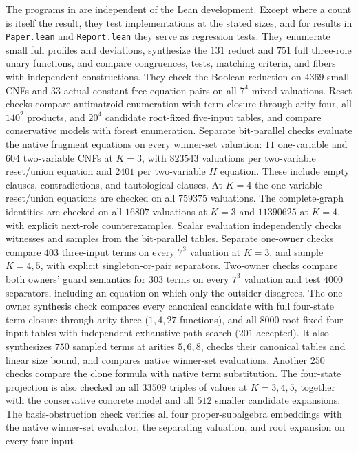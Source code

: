 The programs in  are independent of the Lean development. Except where a count is itself the result, they test implementations at the stated sizes, and for results in \texttt{Paper.lean} and \texttt{Report.lean} they serve as regression tests. They
enumerate small full profiles and deviations, synthesize the $131$
reduct and $751$ full three-role unary functions, and compare congruences,
tests, matching criteria, and fibers with independent constructions.
They check the Boolean reduction on $4369$ small CNFs and $33$ actual
constant-free equation pairs on all $7^4$ mixed valuations. Reset checks
compare antimatroid enumeration with term closure through arity four,
all $140^2$ products, and $20^4$ candidate root-fixed five-input tables,
and compare conservative models with forest enumeration. Separate
bit-parallel checks evaluate the native fragment equations on every
winner-set valuation: $11$ one-variable and $604$ two-variable CNFs at
$K=3$, with $823543$ valuations per two-variable reset/union equation
and $2401$ per two-variable $H$ equation. These include empty clauses,
contradictions, and tautological clauses. At $K=4$ the one-variable
reset/union equations are checked on all $759375$ valuations. The
complete-graph identities are checked on all $16807$ valuations at
$K=3$ and $11390625$ at $K=4$, with explicit next-role counterexamples.
Scalar evaluation independently checks witnesses and samples from the
bit-parallel tables. Separate
one-owner checks compare $403$ three-input terms on every $7^3$
valuation at $K=3$, and sample $K=4,5$, with explicit singleton-or-pair
separators. Two-owner checks compare both owners' guard semantics for
$303$ terms on every $7^3$ valuation and test $4000$ separators,
including an equation on which only the outsider disagrees. The
one-owner synthesis check compares every canonical candidate with full
four-state term closure through arity three ($1,4,27$ functions), and
all $8000$ root-fixed four-input tables with independent exhaustive
path search ($201$ accepted). It also synthesizes $750$ sampled terms
at arities $5,6,8$, checks their canonical tables and linear size bound,
and compares native winner-set evaluations. Another $250$ checks
compare the clone formula with native term substitution. The
four-state projection is also checked on all $33509$ triples of values
at $K=3,4,5$, together with the conservative concrete model and all
$512$ smaller candidate expansions. The basis-obstruction check verifies
all four proper-subalgebra embeddings with the native winner-set evaluator,
the separating valuation, and root expansion on every four-input

